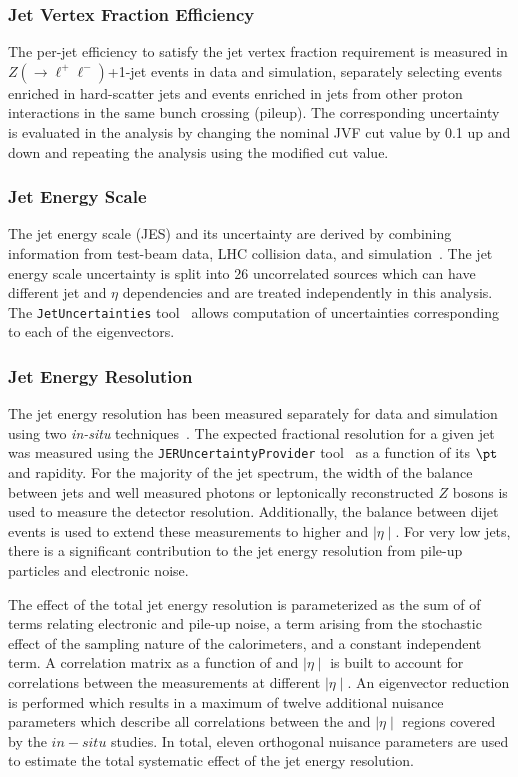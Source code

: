 \subsubsection{Jet Vertex Fraction Efficiency}
\label{sec:syst_jvf}
The per-jet efficiency to satisfy the jet vertex fraction requirement is
measured in $Z(\to \ell^+\ell^-)$+1-jet events in data and simulation, 
separately selecting events enriched in hard-scatter jets and events
enriched in jets from other proton interactions in the same bunch
crossing (pileup). The corresponding uncertainty is evaluated
in the analysis by changing the nominal JVF cut value by 0.1 up and down
and repeating the analysis using the modified cut value.

\subsubsection{Jet Energy Scale}
\label{sec:syst_jes}
The jet energy scale (JES) and its uncertainty are derived by combining
information from test-beam data, LHC collision data, and
simulation~\cite{ATLASJetEnergyMeasurement, insitu1, insitu2, insitu3}.  
The jet energy scale uncertainty is split into 26
uncorrelated sources which can have different jet \pt and $\eta$
dependencies and are treated independently in this analysis.
The \texttt{JetUncertainties} tool~\cite{jesuncertaintyprovider} allows computation of
uncertainties corresponding to each of the eigenvectors.

\subsubsection{Jet Energy Resolution}
\label{sec:syst_jer}
The jet energy resolution has been measured separately for data and simulation
using two {\em in-situ} techniques~\cite{Malaescu:2048678}.
The expected fractional \pt resolution for a given jet was measured using the \texttt{JERUncertaintyProvider} tool~\cite{jeruncertaintyprovider}
as a function of its $\pt$ and rapidity. For the majority of the jet \pt spectrum, the width of the balance between jets and well measured photons or 
leptonically reconstructed $Z$ bosons is used to measure the detector resolution. Additionally, the balance between dijet events is used to extend these measurements to 
higher \pt and $\mid\eta\mid$. For very low \pt jets, there is a significant contribution to the jet energy resolution from pile-up particles and electronic 
noise. 

The effect of the total jet energy resolution is parameterized as the sum of of terms relating electronic and pile-up noise, a term arising from the stochastic 
effect of the sampling nature of the calorimeters, and a constant \pt independent term. A correlation matrix as a function of \pt and $\mid\eta\mid$ is built
to account for correlations between the measurements at different $\mid\eta\mid$. An eigenvector reduction is performed which results in a maximum of
 twelve additional nuisance parameters which describe all correlations between the \pt and $\mid\eta\mid$ regions covered by the $in-situ$ studies. In total, 
eleven orthogonal nuisance parameters are used to estimate the total systematic effect of the jet energy resolution.

